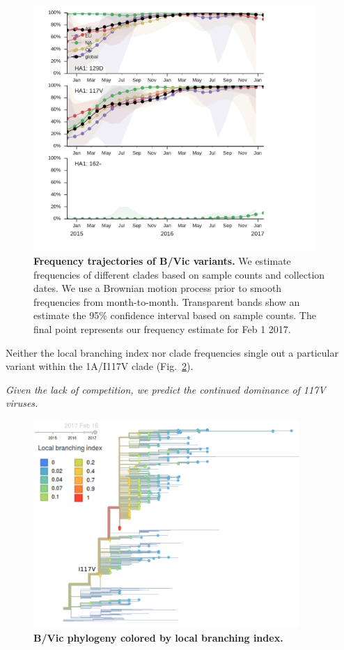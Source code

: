 \documentclass[11pt,oneside,letterpaper]{article}
\begin{document}
\begin{figure}[H]
	\centering
	\includegraphics[width=0.95\textwidth]{../figures/feb-2017/vic_frequencies.pdf}
	\caption{\textbf{Frequency trajectories of B/Vic variants.}
	We estimate frequencies of different clades based on sample counts and collection dates.
	We use a Brownian motion process prior to smooth frequencies from month-to-month.
	Transparent bands show an estimate the 95\% confidence interval based on sample counts.
	The final point represents our frequency estimate for Feb 1 2017.
	}
	\label{Vic_mutations}
\end{figure}

\pagebreak

Neither the local branching index nor clade frequencies single out a particular variant within the 1A/I117V clade (Fig.\ \ref{Vic_lbi}).

\textit{Given the lack of competition, we predict the continued dominance of 117V viruses.}

\begin{figure}[H]
	\centering
	\includegraphics[width=0.9\textwidth]{../figures/feb-2017/Vic_lbi.png}
	\caption{\textbf{B/Vic phylogeny colored by local branching index.}
	}
	\label{Vic_lbi}
\end{figure}
\end{document}
